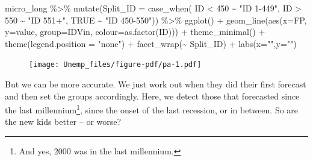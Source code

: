 \documentclass[
  letterpaper,
]{book}
\newenvironment{Shaded}{\begin{snugshade}}{\end{snugshade}}
\newcommand{\AttributeTok}[1]{\textcolor[rgb]{0.40,0.45,0.13}{#1}}
\newcommand{\ConstantTok}[1]{\textcolor[rgb]{0.56,0.35,0.01}{#1}}
\newcommand{\DecValTok}[1]{\textcolor[rgb]{0.68,0.00,0.00}{#1}}
\newcommand{\FunctionTok}[1]{\textcolor[rgb]{0.28,0.35,0.67}{#1}}
\newcommand{\NormalTok}[1]{\textcolor[rgb]{0.00,0.23,0.31}{#1}}
\newcommand{\SpecialCharTok}[1]{\textcolor[rgb]{0.37,0.37,0.37}{#1}}
\newcommand{\StringTok}[1]{\textcolor[rgb]{0.13,0.47,0.30}{#1}}
\begin{document}
\begin{Shaded}
\begin{Highlighting}[]
\NormalTok{micro\_long }\SpecialCharTok{\%\textgreater{}\%} 
  \FunctionTok{mutate}\NormalTok{(}\AttributeTok{Split\_ID =} \FunctionTok{case\_when}\NormalTok{(}
\NormalTok{    ID }\SpecialCharTok{\textless{}} \DecValTok{450} \SpecialCharTok{\textasciitilde{}} \StringTok{"ID 1{-}449"}\NormalTok{,}
\NormalTok{    ID }\SpecialCharTok{\textgreater{}} \DecValTok{550} \SpecialCharTok{\textasciitilde{}} \StringTok{"ID 551+"}\NormalTok{,}
    \ConstantTok{TRUE}     \SpecialCharTok{\textasciitilde{}} \StringTok{"ID 450{-}550"}\NormalTok{)) }\SpecialCharTok{\%\textgreater{}\%}
  \FunctionTok{ggplot}\NormalTok{() }\SpecialCharTok{+} 
  \FunctionTok{geom\_line}\NormalTok{(}\FunctionTok{aes}\NormalTok{(}\AttributeTok{x=}\NormalTok{FP, }\AttributeTok{y=}\NormalTok{value, }\AttributeTok{group=}\NormalTok{IDVin, }\AttributeTok{colour=}\FunctionTok{as.factor}\NormalTok{(ID))) }\SpecialCharTok{+}
  \FunctionTok{theme\_minimal}\NormalTok{() }\SpecialCharTok{+}
  \FunctionTok{theme}\NormalTok{(}\AttributeTok{legend.position =} \StringTok{"none"}\NormalTok{) }\SpecialCharTok{+}
  \FunctionTok{facet\_wrap}\NormalTok{(}\SpecialCharTok{\textasciitilde{}}\NormalTok{ Split\_ID) }\SpecialCharTok{+}
  \FunctionTok{labs}\NormalTok{(}\AttributeTok{x=}\StringTok{""}\NormalTok{,}\AttributeTok{y=}\StringTok{""}\NormalTok{)}
\end{Highlighting}
\end{Shaded}

\begin{figure}[H]

{\centering \texttt{[image: Unemp\_files/figure-pdf/pa-1.pdf]}

}

\end{figure}

But we can be more accurate. We just work out when they did their first
forecast and then set the groups accordingly. Here, we detect those that
forecasted since the last millennium\footnote{And yes, 2000 was in the
  last millennium.}, since the onset of the last recession, or in
between. So are the new kids better -- or worse?
\end{document}
